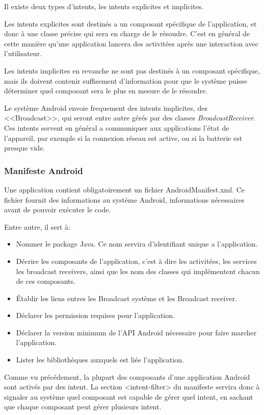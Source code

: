 \documentclass[12pt]{article}
\begin{document}
Il existe deux types d'intents, les intents explicites et implicites.

Les intents explicites sont destinés a un composant spécifique de l'application, et donc à une classe précise qui sera en charge de le résoudre. C'est en général de cette manière qu'une application lancera des activitées après une interaction avec l'utilisateur.

Les intents implicites en revanche ne sont pas destinés à un composant spécifique, mais ils doivent contenir suffisement d'information pour que le système puisse déterminer quel composant sera le plus en mesure de le résoudre.

Le système Android envoie frequement des intents implicites, des <<Broadcast>>, qui seront entre autre gérés par des classes \textit{BroadcastReceiver}.
Ces intents servent en général a communiquer aux applications l'état de l'appareil, par exemple si la connexion réseau est active, ou si la batterie est presque vide.

\subsubsection{Manifeste Android}
Une application contient obligatoirement un fichier AndroidManifest.xml. Ce fichier fournit des informations au système Android, informations nécessaires avant de pouvoir exécuter le code.

Entre autre, il sert à:
\begin{itemize}
\item Nommer le package Java. Ce nom servira d'identifiant unique a l'application.
\item Décrire les composants de l'application, c'est à dire les activitées, les services les broadcast receivers, ainsi que les nom des classes qui implémentent chacun de ces composants.
\item Établir les liens entres les Broadcast système et les Broadcast receiver.
\item Déclarer les permission requises pour l'application.
\item Déclarer la version minimum de l'API Android nécessaire pour faire marcher l'application.
\item Lister les bibliothèques auxquels est liée l'application.
\end{itemize}

Comme vu précédement, la plupart des composants d'une application Android sont activés par des intent. La section <intent-filter> du manifeste servira donc à signaler au système quel composant est capable de gérer quel intent, en sachant que chaque composant peut gérer plusieurs intent.
\end{document}
